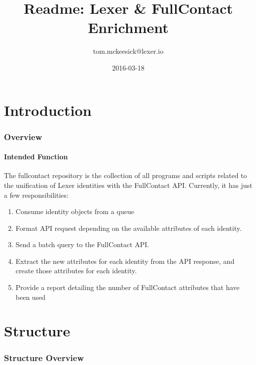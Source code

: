 \documentclass{article}
\title{Readme: Lexer \& FullContact Enrichment}
\author{tom.mckeesick@lexer.io}
\date{2016-03-18}
\begin{document}
\maketitle

\tableofcontents
\cleardoublepage

\part{Introduction}
\section{Overview}
\subsection{Intended Function}
The fullcontact repository is the collection of all programs and scripts related to the unification of Lexer identities with the FullContact API.
Currently, it has just a few responsibilities:
\begin{enumerate}
  \item Consume identity objects from a queue
  \item Format API request depending on the available attributes of each identity.
  \item Send a batch query to the FullContact API.
  \item Extract the new attributes for each identity from the API response, and create those attributes for each identity.
  \item Provide a report detailing the number of FullContact attributes that have been used
\end{enumerate}

\cleardoublepage

\part{Structure}
\section{Structure Overview}
\end{document}
